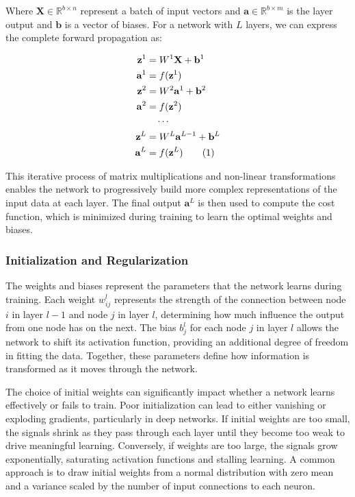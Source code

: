 \documentclass[aps,pra,english,notitlepage,reprint,nofootinbib]{revtex4-1}  %
\newcommand\numberthis{\addtocounter{equation}{1}\tag{\theequation}}
\begin{document}
Where \( \mathbf{X} \in \mathbb{R}^{b \times n}\) represent a batch of input vectors and \( \mathbf{a} \in \mathbb{R}^{b \times m} \) is the layer output and \( \mathbf{b} \) is a vector of biases. For a network with \( L \) layers, we can express the complete forward propagation as:

\begin{align*}
    \mathbf{z}^1 &= W^1\mathbf{X} + \mathbf{b}^1 \\ 
    \mathbf{a}^1 &= f(\mathbf{z}^1) \\
    \mathbf{z}^2 &= W^2\mathbf{a}^1 + \mathbf{b}^2 \\
    \mathbf{a}^2 &= f(\mathbf{z}^2) \\
    & \quad \cdots \\
    \mathbf{z}^L &= W^L\mathbf{a}^{L-1} + \mathbf{b}^L \\
    \mathbf{a}^L &= f(\mathbf{z}^L) \numberthis \label{eqn}
\end{align*}

This iterative process of matrix multiplications and non-linear transformations enables the network to progressively build more complex representations of the input data at each layer. The final output \( \mathbf{a}^L \) is then used to compute the cost function, which is minimized during training to learn the optimal weights and biases.

\subsubsection{Initialization and Regularization}
The weights and biases represent the parameters that the network learns during training. Each weight \(w_{ij}^l \) represents the strength of the connection between node \( i \) in layer \( l-1 \) and node \( j \) in layer \( l \), determining how much influence the output from one node has on the next. The bias \( b_j^l \) for each node \( j \) in layer \( l \) allows the network to shift its activation function, providing an additional degree of freedom in fitting the data. Together, these parameters define how information is transformed as it moves through the network.

The choice of initial weights can significantly impact whether a network learns effectively or fails to train. Poor initialization can lead to either vanishing or exploding gradients, particularly in deep networks. If initial weights are too small, the signals shrink as they pass through each layer until they become too weak to drive meaningful learning. Conversely, if weights are too large, the signals grow exponentially, saturating activation functions and stalling learning.
A common approach is to draw initial weights from a normal distribution with zero mean and a variance scaled by the number of input connections to each neuron.
\end{document}
